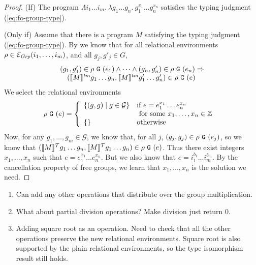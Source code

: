\begin{proof}
  (If) The program $\Lambda i_1\dots i_m.\ \lambda g_1\dots g_n.\
  g_1^{x_1}\dots g_n^{x_n}$ satisfies the typing judgment
  (\ref{eq:fo-group-type}).

  (Only if) Assume that there is a program $M$ satisfying the typing
  judgment (\ref{eq:fo-group-type}). By \thmref{thm:abstraction} we
  know that for all relational environments $\rho \in
  \mathcal{E}_{\mathit{Grp}}(i_1,\dots,i_m)$, and all $g_j,g'_j \in G$,
  \begin{displaymath}
    \begin{array}{l}
      (g_1,g'_1) \in \rho\ \tyPrimNm{G}\ (e_1) \land \dots \land (g_n,g'_n) \in \rho\ \tyPrimNm{G}\ (e_n) \Rightarrow \\
      \quad (\tmSem{M}g_1\dots g_n, \tmSem{M}g'_1\dots g'_n) \in \rho\ \tyPrimNm{G}\ (e)
    \end{array}
  \end{displaymath}
  We select the relational environments
  \begin{displaymath}
    \rho\ \tyPrimNm{G}\ (e) = \left\{
      \begin{array}{ll}
        \{(g,g) \sepbar g \in \mathcal{G} \} &
        \begin{array}[t]{@{}l}
          \textrm{if}\ e = e_1^{x_1}\dots e_n^{x_n} \\
          \textrm{ for some }x_1,\dots,x_n \in \mathbb{Z}
        \end{array}
        \\
        \{\} & \textrm{otherwise}
      \end{array}
    \right.
  \end{displaymath}
  Now, for any $g_1,\dots,g_m \in \mathcal{G}$, we know that, for all
  $j$, $(g_j,g_j) \in \rho\ \tyPrimNm{G}\ (e_j)$, so we know that
  $(\llbracket M \rrbracket^{\mathcal{T}}g_1\dots g_n, \llbracket M \rrbracket^{\mathcal{T}}g_1 \dots g_n) \in \rho\
  \texttt{G}\ (e)$. Thus there exist integers $x_1,...,x_n$ such
  that $e = e_1^{x_1}\dots e_n^{x_n}$. But we also know that $e =
  i_1^{b_1}...i_m^{b_m}$. By the cancellation property of free groups,
  we learn that $x_1,...,x_n$ is the solution we need.
\end{proof}

\begin{enumerate}
\item Can add any other operations that distribute over the group
  multiplication.
\item What about partial division operations? Make division just
  return $0$.
\item Adding square root as an operation. Need to check that all the
  other operations preserve the new relational environments. Square
  root is also supported by the plain relational environments, so the
  type isomorphism result still holds.
\end{enumerate}



